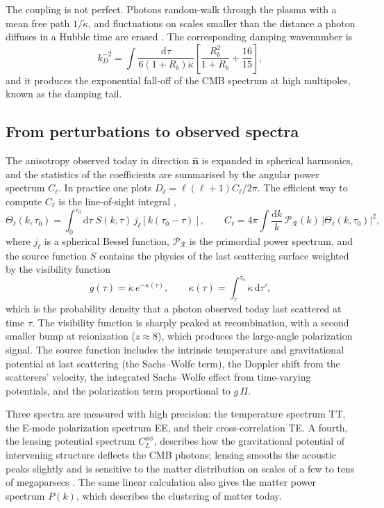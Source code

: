\documentclass[11pt,a4paper]{article}
\newcommand{\dd}{\mathrm{d}}
\begin{document}
The coupling is not perfect. Photons random-walk through the plasma with a mean free path $1/\dot\kappa$, and fluctuations on scales smaller than the distance a photon diffuses in a Hubble time are erased \citep{Silk1968}. The corresponding damping wavenumber is
\begin{equation}
k_D^{-2} = \int \frac{\dd\tau}{6(1+R_b)\dot\kappa}\left[\frac{R_b^2}{1+R_b} + \frac{16}{15}\right],
\end{equation}
and it produces the exponential fall-off of the CMB spectrum at high multipoles, known as the damping tail.

\subsection{From perturbations to observed spectra}

The anisotropy observed today in direction $\hat{\mathbf n}$ is expanded in spherical harmonics, and the statistics of the coefficients are summarised by the angular power spectrum $C_\ell$. In practice one plots $D_\ell = \ell(\ell+1)C_\ell/2\pi$. The efficient way to compute $C_\ell$ is the line-of-sight integral \citep{SeljakZaldarriaga1996},
\begin{equation}
\Theta_\ell(k,\tau_0) = \int_0^{\tau_0} \dd\tau\; S(k,\tau)\, j_\ell\!\left[k(\tau_0-\tau)\right],
\qquad
C_\ell = 4\pi\int \frac{\dd k}{k}\,\mathcal{P}_\mathcal{R}(k)\,\left|\Theta_\ell(k,\tau_0)\right|^2,
\label{eq:los}
\end{equation}
where $j_\ell$ is a spherical Bessel function, $\mathcal{P}_\mathcal{R}$ is the primordial power spectrum, and the source function $S$ contains the physics of the last scattering surface weighted by the visibility function
\begin{equation}
g(\tau) = \dot\kappa\, e^{-\kappa(\tau)},\qquad \kappa(\tau) = \int_\tau^{\tau_0}\dot\kappa\,\dd\tau',
\end{equation}
which is the probability density that a photon observed today last scattered at time $\tau$. The visibility function is sharply peaked at recombination, with a second smaller bump at reionization ($z\approx 8$), which produces the large-angle polarization signal. The source function includes the intrinsic temperature and gravitational potential at last scattering (the Sachs--Wolfe term), the Doppler shift from the scatterers' velocity, the integrated Sachs--Wolfe effect from time-varying potentials, and the polarization term proportional to $g\,\Pi$.

Three spectra are measured with high precision: the temperature spectrum TT, the E-mode polarization spectrum EE, and their cross-correlation TE. A fourth, the lensing potential spectrum $C_L^{\phi\phi}$, describes how the gravitational potential of intervening structure deflects the CMB photons; lensing smooths the acoustic peaks slightly and is sensitive to the matter distribution on scales of a few to tens of megaparsecs \citep{LewisChallinor2006}. The same linear calculation also gives the matter power spectrum $P(k)$, which describes the clustering of matter today.
\end{document}
